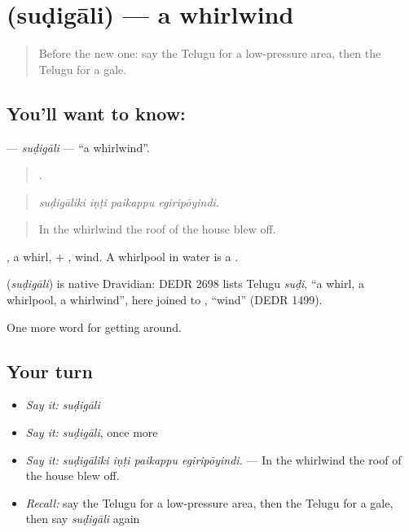 \section[\texorpdfstring{\te{సుడిగాలి} (suḍigāli)}{సుడిగాలి (suḍigāli)}]{ (suḍigāli) — a whirlwind}

\label{lesson:TE-C478-sudigali}



\begin{quote}
Before the new one: say the Telugu for a low-pressure area, then the Telugu for a gale.
\end{quote}

\subsection*{You'll want to know: }
\textbf{} — \emph{suḍigāli} — \textquotedblleft{}a whirlwind\textquotedblright{}.

\begin{quote}
   .
\end{quote}

\begin{quote}
\emph{suḍigāliki iṇṭi paikappu egiripōyindi.}
\end{quote}

\begin{quote}
In the whirlwind the roof of the house blew off.
\end{quote}

, a whirl, + , wind. A whirlpool in water is a .

\begin{cousinweb}
\textbf{} (\emph{suḍigāli}) is native Dravidian: DEDR 2698 lists Telugu \emph{suḍi}, \textquotedblleft{}a whirl, a whirlpool, a whirlwind\textquotedblright{}, here joined to , \textquotedblleft{}wind\textquotedblright{} (DEDR 1499).
\end{cousinweb}

\begin{grammarlens}[title={What you've built}]
One more word for getting around.
\end{grammarlens}

\subsection*{Your turn}
\begin{itemize}
\raggedright
  \item \emph{Say it:} \emph{suḍigāli}
  \item \emph{Say it:} \emph{suḍigāli}, once more
  \item \emph{Say it:} \emph{suḍigāliki iṇṭi paikappu egiripōyindi.} — In the whirlwind the roof of the house blew off.
  \item \emph{Recall:} say the Telugu for a low-pressure area, then the Telugu for a gale, then say \emph{suḍigāli} again
\end{itemize}

